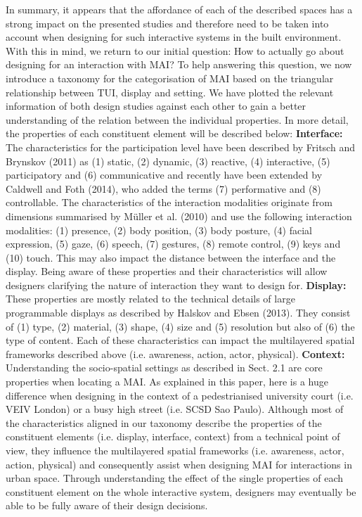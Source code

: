 In summary, it appears that the affordance of each of the described spaces has a strong impact on the presented studies and therefore need to be taken into account when designing for such interactive systems in the built environment. 
With this in mind, we return to our initial question: How to actually go about designing for an interaction with MAI? 
To help answering this question, we now introduce a taxonomy for the categorisation of MAI based on the triangular relationship between TUI, display and setting. 
We have plotted the relevant information of both design studies against each other to gain a better understanding of the relation between the individual properties.
In more detail, the properties of each constituent element will be described below:
\textbf{Interface: }The characteristics for the participation level have been described by Fritsch and Brynskov (2011) as (1) static, (2) dynamic, (3) reactive, (4) interactive, (5) participatory and (6) communicative and recently have been extended by Caldwell and Foth (2014), who added the terms (7) performative and (8) controllable.
The characteristics of the interaction modalities originate from dimensions summarised by Müller et al. (2010) and use the following interaction modalities:
(1) presence, (2) body position, (3) body posture, (4) facial expression, (5) gaze, (6) speech, (7) gestures, (8) remote control, (9) keys and (10) touch. 
This may also impact the distance between the interface and the display. 
Being aware of these properties and their characteristics will allow designers clarifying the nature of interaction they want to design for.
\textbf{Display: }These properties are mostly related to the technical details of large programmable displays as described by Halskov and Ebsen (2013). They consist of (1) type, (2) material, (3) shape, (4) size and (5) resolution but also of (6) the type of content. Each of these characteristics can impact the multilayered spatial frameworks described above (i.e. awareness, action, actor, physical).
\textbf{Context: }Understanding the socio-spatial settings as described in Sect. 2.1 are core properties when locating a MAI. As explained in this paper, here is a huge difference when designing in the context of a pedestrianised university court (i.e. VEIV London) or a busy high street (i.e. SCSD Sao Paulo).
Although most of the characteristics aligned in our taxonomy describe the properties of the constituent elements (i.e. display, interface, context) from a technical point of view, they influence the multilayered spatial frameworks (i.e. awareness, actor, action, physical) and consequently assist when designing MAI for interactions in urban space. 
Through understanding the effect of the single properties of each constituent element on the whole interactive system, designers may eventually be able to be fully aware of their design decisions.

